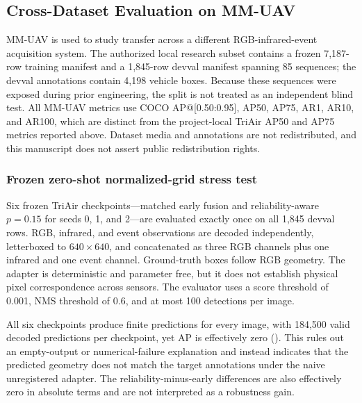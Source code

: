 \subsection{Cross-Dataset Evaluation on MM-UAV}
\label{sec:mmuav}
MM-UAV is used to study transfer across a different RGB-infrared-event acquisition system. The authorized local research subset contains a frozen 7,187-row training manifest and a 1,845-row devval manifest spanning 85 sequences; the devval annotations contain 4,198 vehicle boxes. Because these sequences were exposed during prior engineering, the split is not treated as an independent blind test. All MM-UAV metrics use COCO AP@[0.50:0.95], AP50, AP75, AR1, AR10, and AR100, which are distinct from the project-local TriAir AP50 and AP75 metrics reported above. Dataset media and annotations are not redistributed, and this manuscript does not assert public redistribution rights.

\subsubsection{Frozen zero-shot normalized-grid stress test}
Six frozen TriAir checkpoints---matched early fusion and reliability-aware $p=0.15$ for seeds 0, 1, and 2---are evaluated exactly once on all 1,845 devval rows. RGB, infrared, and event observations are decoded independently, letterboxed to $640\times640$, and concatenated as three RGB channels plus one infrared and one event channel. Ground-truth boxes follow RGB geometry. The adapter is deterministic and parameter free, but it does not establish physical pixel correspondence across sensors. The evaluator uses a score threshold of 0.001, NMS threshold of 0.6, and at most 100 detections per image.

All six checkpoints produce finite predictions for every image, with 184,500 valid decoded predictions per checkpoint, yet AP is effectively zero (). This rules out an empty-output or numerical-failure explanation and instead indicates that the predicted geometry does not match the target annotations under the naive unregistered adapter. The reliability-minus-early differences are also effectively zero in absolute terms and are not interpreted as a robustness gain.

